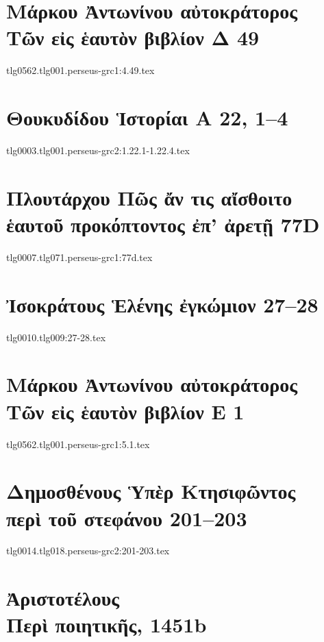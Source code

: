 \documentclass[a4paper,12pt,twoside]{report}
\begin{document}
\chapter[Μάρκου Ἀντωνίνου Τῶν εἰς ἑαυτὸν Δ 49]{\textgreek[variant=ancient]{Μάρκου Ἀντωνίνου αὐτοκράτορος \\Τῶν εἰς ἑαυτὸν βιβλίον Δ} 49}
{tlg0562.tlg001.perseus-grc1:4.49.tex}

\chapter[Θουκυδίδου Ἱστορίαι Α]{\textgreek[variant=ancient]{Θουκυδίδου Ἱστορίαι Α} 22, 1–4}
{tlg0003.tlg001.perseus-grc2:1.22.1-1.22.4.tex}

\chapter[Πλουτάρχου Πῶς ἄν τις αἴσθοιτο ἑαυτοῦ\dots]{\textgreek[variant=ancient]{Πλουτάρχου Πῶς ἄν τις αἴσθοιτο ἑαυτοῦ προκόπτοντος ἐπ' ἀρετῇ} 77D}
{tlg0007.tlg071.perseus-grc1:77d.tex}

\chapter[Ἰσοκράτους Ἑλένης ἐγκώμιον 27]{\textgreek[variant=ancient]{Ἰσοκράτους Ἑλένης ἐγκώμιον} 27–28}
{tlg0010.tlg009:27-28.tex}

\chapter[Μάρκου Ἀντωνίνου Τῶν εἰς ἑαυτὸν Ε 1]{\textgreek[variant=ancient]{Μάρκου Ἀντωνίνου αὐτοκράτορος \\Τῶν εἰς ἑαυτὸν βιβλίον Ε} 1}
{tlg0562.tlg001.perseus-grc1:5.1.tex}

\chapter[Δημοσθένους Περὶ τοῦ στεφάνου]{\textgreek[variant=ancient]{Δημοσθένους Ὑπὲρ Κτησιφῶντος \\περὶ τοῦ στεφάνου} 201–203}
{tlg0014.tlg018.perseus-grc2:201-203.tex}

\chapter[Ἀριστοτέλους Περὶ ποιητικῆς]{\textgreek[variant=ancient]{Ἀριστοτέλους \\Περὶ ποιητικῆς,} 1451b}
\end{document}
